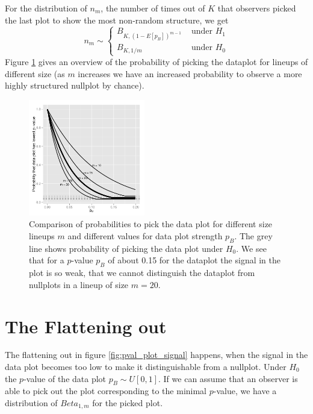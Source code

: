 \documentclass[11pt]{article}
\begin{document}
For the distribution of $n_m$, the number of times out of $K$ that observers picked the last plot to show the most non-random structure, we get
\[
n_m\sim \left \{ 
\begin{array}{cl}
B_{K, (1-E[p_B])^{m-1}} & \text { under } H_1\\
B_{K, 1/m} & \text { under } H_0
\end{array}
\right .
\]
Figure \ref{power} gives an overview of the probability of picking the dataplot for lineups of different size (as $m$ increases we have an increased probability to observe a more highly structured nullplot by chance).

\begin{figure}[htbp] %
   \centering
   \includegraphics[width=2in]{images/powerplot.pdf} 
   \caption{Comparison of probabilities to pick the data plot for different size lineups $m$ and different values for data plot strength $p_B$. The grey line shows probability of picking the data plot under $H_0$. We see that for a $p$-value $p_B$ of about 0.15 for the dataplot the signal in the plot is so weak, that we cannot distinguish the dataplot from nullplots in a lineup of size $m=20$. }
   \label{power}
\end{figure}

\section{The Flattening out}
The flattening out in figure \ref{fig:pval_plot_signal} happens, when the signal in the data plot becomes too low to make it distinguishable from a nullplot. 
Under $H_0$ the $p$-value of the data plot $p_B \sim U[0,1]$. If we can assume that an observer is able to pick out the plot corresponding to the minimal $p$-value, we have a distribution of $Beta_{1, m}$ for the picked plot. 
\end{document}

